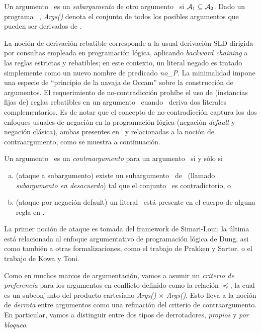  Un argumento \AaQa\ es un \textit{subargumento} de otro argumento
 \AbQb\ si $\mbox{${\mathcal A_1}$} \subseteq \mbox{${\mathcal A_2}$}$. Dado un programa \DLP\ \PP,
 \textit{Args(\PP)} denota el conjunto de todos los posibles argumentos
 que  pueden ser derivados de \PP.

 La noción de derivación rebatible corresponde a la usual derivación
 SLD dirigida por consultas empleada en programación lógica, aplicando
 \textit{backward chaining} a las reglas estrictas y rebatibles; en
 este contexto, un literal negado  es tratado simplemente
 como un nuevo nombre de predicado \textit{no\_P}. La minimalidad
 impone una especie de ``principio de la navaja de Occam'' sobre la
 construcción  de argumentos. El requerimiento de no-contradicción
 prohíbe el uso de (instancias fijas de) reglas rebatibles en un
 argumento \ArgA\ cuando \SyA\ deriva dos literales complementarios. Es
 de notar que el concepto de no-contradicción captura los dos enfoques
 usuales de negación en la programación lógica (negación
 \textit{default} y negación clásica), ambas presentes en \DLP\ y
 relacionadas a la noción de contraargumento, como se muestra a
 continuación.
 
 \begin{definicion}
 \label{def:contraargumento}
 
 Un argumento \AaQa\ es un \textit{contraargumento} para un argumento
 \AbQb\ si y sólo si
 
 \begin{enumerate}[a)]
 
 \item (ataque a subargumento) existe un subargumento \AQ\ de \AbQb\ 
 (llamado \textit{subargumento en desacuerdo}) tal que el conjunto 
 \SyQaQ\ es contradictorio, o
 
 \item (ataque por negación default) un literal \negda{\ArgQa}\ está
 presente en el cuerpo de alguna  regla en \ArgAb.
 
 \end{enumerate}  
 \end{definicion}
 
 La primer noción de ataque es tomada del framework de Simari-Loui; la
 última está relacionada al  enfoque argumentativo de programación
 lógica de Dung, asi como también a otras formalizaciones, como el
 trabajo de Prakken y Sartor, o el trabajo de Kowa y Toni.
 
 Como en muchos marcos de argumentación, vamos a asumir un
 \textit{criterio de preferencia} para los  argumentos en conflicto
 definido como la relación $\preceq$, la cual es un subconjunto del
 producto  cartesiano \textit{Args(\PP)} $\times$ \textit{Args(\PP)}.
 Esto lleva a la noción de \textit{derrota} entre argumentos como una
 refinación del criterio de contraargumento. En particular, vamos a
 distinguir entre  dos tipos de derrotadores, \textit{propios} y
 \textit{por bloqueo}.
 
